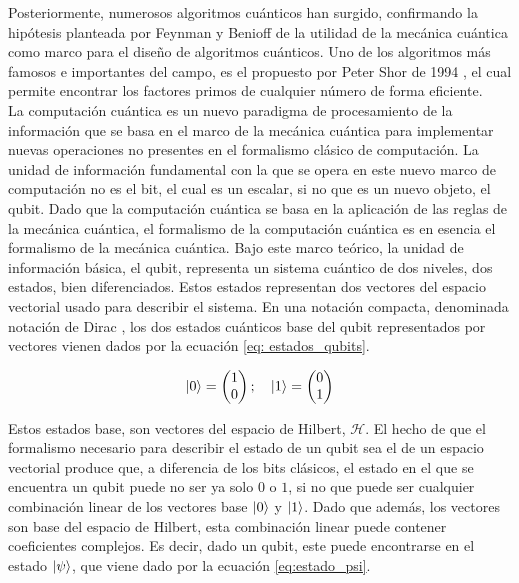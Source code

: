 Posteriormente, numerosos algoritmos cuánticos han surgido, confirmando la hipótesis planteada por Feynman y Benioff de la utilidad de la mecánica cuántica como marco para el diseño de algoritmos cuánticos. Uno de los algoritmos más famosos e importantes del campo, es el propuesto por Peter Shor de 1994 \citep{shor}, el cual permite encontrar los factores primos de cualquier número de forma eficiente. \\

La computación cuántica es un nuevo paradigma de procesamiento de la información que se basa en el marco de la mecánica cuántica para implementar nuevas operaciones no presentes en el formalismo clásico de computación. La unidad de información fundamental con la que se opera en este nuevo marco de computación no es el bit, el cual es un escalar, si no que es un nuevo objeto, el qubit. Dado que la computación cuántica se basa en la aplicación de las reglas de la mecánica cuántica, el formalismo de la computación cuántica es en esencia el formalismo de la mecánica cuántica. Bajo este marco teórico, la unidad de información básica, el qubit, representa un sistema cuántico de dos niveles, dos estados, bien diferenciados. Estos estados representan dos vectores del espacio vectorial usado para describir el sistema. En una notación compacta, denominada notación de Dirac \citep{dirac1939}, los dos estados cuánticos base del qubit representados por vectores vienen dados por la ecuación  \ref{eq: estados_qubits}.  


\begin{equation}
    \ket{0} = 
    \begin{pmatrix}
        1 \\
        0
    \end{pmatrix}
    ;
    \quad
    \ket{1} = 
    \begin{pmatrix}
        0 \\
        1
    \end{pmatrix}
    \label{eq: estados_qubits}
\end{equation}


Estos estados base, son vectores del espacio de Hilbert, $\mathcal{H}$. El hecho de que el formalismo necesario para describir el estado de un qubit sea el de un espacio vectorial produce que, a diferencia de los bits clásicos, el estado en el que se encuentra un qubit puede no ser ya solo $0$ o $1$, si no que puede ser cualquier combinación linear de los vectores base $\ket{0}$ y $\ket{1}$. Dado que además, los vectores son base del espacio de Hilbert, esta combinación linear puede contener coeficientes complejos. Es decir, dado un qubit, este puede encontrarse en el estado $\ket{\psi}$, que viene dado por la ecuación \ref{eq:estado_psi}.

